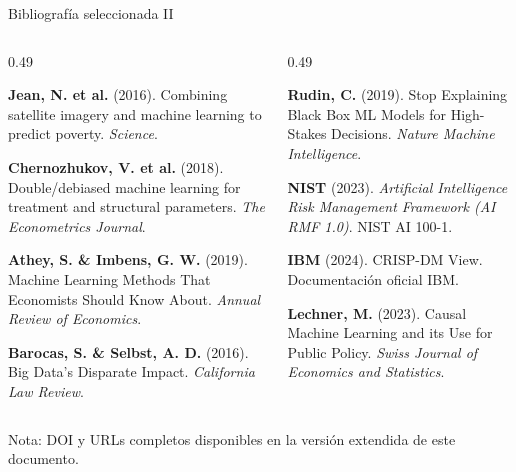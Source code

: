 \documentclass[aspectratio=169,11pt,table]{beamer}
\newcommand{\refentry}[3]{%
  \par\noindent\textbf{#1} \textcolor{ccdemid}{(#2)}. #3\par
  \vspace{0.5em}
}
\begin{document}
\begin{frame}{Bibliografía seleccionada II}
\vfill
\footnotesize
\begin{columns}[T,onlytextwidth]
\begin{column}{0.49\textwidth}
\refentry{Jean, N. et al.}{2016}{Combining satellite imagery and machine learning to predict poverty. \textit{Science}.}
\refentry{Chernozhukov, V. et al.}{2018}{Double/debiased machine learning for treatment and structural parameters. \textit{The Econometrics Journal}.}
\refentry{Athey, S. \& Imbens, G. W.}{2019}{Machine Learning Methods That Economists Should Know About. \textit{Annual Review of Economics}.}
\refentry{Barocas, S. \& Selbst, A. D.}{2016}{Big Data's Disparate Impact. \textit{California Law Review}.}
\end{column}
\begin{column}{0.49\textwidth}
\refentry{Rudin, C.}{2019}{Stop Explaining Black Box ML Models for High-Stakes Decisions. \textit{Nature Machine Intelligence}.}
\refentry{NIST}{2023}{\textit{Artificial Intelligence Risk Management Framework (AI RMF 1.0)}. NIST AI 100-1.}
\refentry{IBM}{2024}{CRISP-DM View. Documentación oficial IBM.}
\refentry{Lechner, M.}{2023}{Causal Machine Learning and its Use for Public Policy. \textit{Swiss Journal of Economics and Statistics}.}
\end{column}
\end{columns}

\vfill
\begin{center}
{\scriptsize\textcolor{ccdemid}{Nota: DOI y URLs completos disponibles en la versión extendida de este documento.}}
\end{center}
\end{frame}
\end{document}
